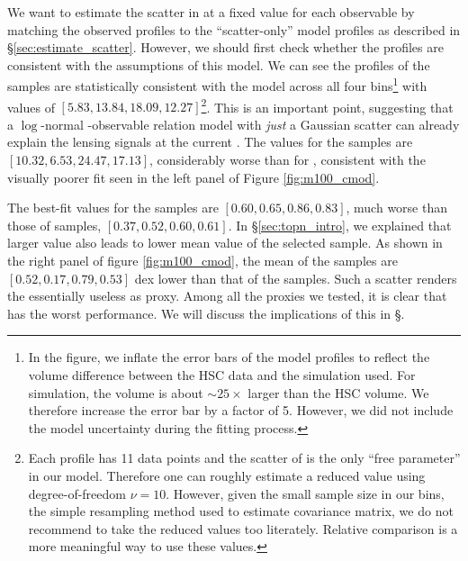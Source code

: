 \documentclass[fleqn,usenatbib,useAMS,english]{mnras}
\begin{document}
    We want to estimate the scatter in \logmvir{} at a fixed value for each observable by
    matching the observed \dsigma{} profiles to the ``scatter-only'' model profiles as
    described in \S \ref{sec:estimate_scatter}.
    However, we should first check whether the \dsigma{} profiles are consistent with the
    assumptions of this model.
    We can see the \dsigma{} profiles of the  samples are statistically
    consistent with the model across all four bins\footnote{In the figure, we inflate the error bars of the
    model profiles to reflect the volume difference between the HSC data and the simulation
    used. For  simulation, the volume is about $\sim 25 \times$ larger than the HSC
    volume. We therefore increase the error bar by a factor of 5. However, we did not
    include the model uncertainty during the fitting process.} with \chisq{} values of
    $[5.83, 13.84, 18.09, 12.27]$\footnote{Each \dsigma{} profile has 11 data points and
    the scatter of \logmvir{} is the only ``free parameter'' in our model. Therefore one
    can roughly estimate a reduced \chisq{} value using degree-of-freedom $\nu=10$. However,
    given the small sample size in our \topn{} bins, the simple resampling method used to
    estimate covariance matrix, we do not recommend to take the reduced \chisq{} values
    too literately. Relative comparison is a more meaningful way to use these \chisq{} values.}.
    This is an important point, suggesting that a $\log$-normal \mvir{}-observable relation
    model with \emph{just} a Gaussian scatter can already explain the lensing signals at the
    current \snratio{}.
    The \chisq{} values for the \mcmodel{} samples are $[10.32, 6.53, 24.47, 17.13]$,
    considerably worse than for , consistent with the visually poorer fit seen in
    the left panel of Figure \ref{fig:m100_cmod}.

    The best-fit \sigmvir{} values for the \mcmodel{} samples are $[0.60, 0.65, 0.86, 0.83]$,
    much worse than those of  samples, $[0.37, 0.52, 0.60, 0.61]$.
    In \S \ref{sec:topn_intro}, we explained that larger \sigmvir{} value also leads to
    lower mean \mvir{} value of the selected sample.
    As shown in the right panel of figure \ref{fig:m100_cmod}, the mean \mvir{} of the
    \mcmodel{} \topn{} samples are $[0.52, 0.17, 0.79, 0.53]$ dex lower than that of
    the \maper{} samples.
    Such a scatter renders the \mcmodel{} essentially useless as \mvir{} proxy.
    Among all the \mvir{} proxies we tested, it is clear that \mcmodel{} has the worst
    performance.
    We will discuss the implications of this in \S {}.
\end{document}
